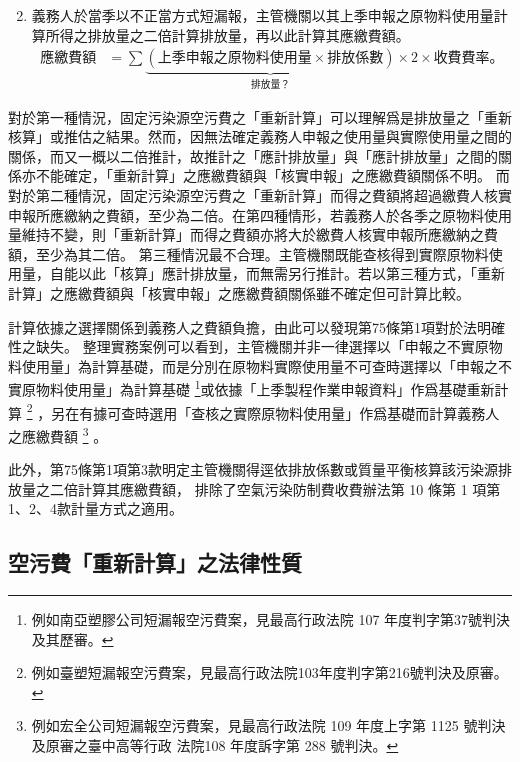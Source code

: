 \begin{enumerate}
\begin{equation*}
         \end{equation*}
         \item 義務人於當季以不正當方式短漏報，主管機關以其上季申報之原物料使用量計算所得之排放量之二倍計算排放量，再以此計算其應繳費額。
         \begin{equation*}
            \begin{aligned}
               \text{應繳費額}
               &=\sum \underbrace{\left(\text{上季申報之原物料使用量}\times\text{排放係數}\right)}_{\textstyle\text{排放量？}}\times 2\times
               \text{收費費率。}
            \end{aligned}
            \end{equation*}
\end{enumerate}

對於第一種情況，固定污染源空污費之「重新計算」可以理解爲是排放量之「重新核算」或推估之結果。然而，因無法確定義務人申報之使用量與實際使用量之間的關係，而又一概以二倍推計，故推計之「應計排放量」與「應計排放量」之間的關係亦不能確定，「重新計算」之應繳費額與「核實申報」之應繳費額關係不明。
而對於第二種情況，固定污染源空污費之「重新計算」而得之費額將超過繳費人核實申報所應繳納之費額，至少為二倍。在第四種情形，若義務人於各季之原物料使用量維持不變，則「重新計算」而得之費額亦將大於繳費人核實申報所應繳納之費額，至少為其二倍。
第三種情況最不合理。主管機關既能查核得到實際原物料使用量，自能以此「核算」應計排放量，而無需另行推計。若以第三種方式，「重新計算」之應繳費額與「核實申報」之應繳費額關係雖不確定但可計算比較。

計算依據之選擇關係到義務人之費額負擔，由此可以發現第75條第1項對於法明確性之缺失。
整理實務案例可以看到，主管機關并非一律選擇以「申報之不實原物料使用量」為計算基礎，而是分別在原物料實際使用量不可查時選擇以「申報之不實原物料使用量」為計算基礎
\footnote{例如南亞塑膠公司短漏報空污費案，見最高行政法院 107 年度判字第37號判決及其歷審。}或依據「上季製程作業申報資料」作爲基礎重新計算
\footnote{例如臺塑短漏報空污費案，見最高行政法院103年度判字第216號判決及原審。}
，另在有據可查時選用「查核之實際原物料使用量」作爲基礎而計算義務人之應繳費額
\footnote{例如宏全公司短漏報空污費案，見最高行政法院 109 年度上字第 1125 號判決及原審之臺中高等行政
法院108 年度訴字第 288 號判決。}
。

此外，第75條第1項第3款明定主管機關得逕依排放係數或質量平衡核算該污染源排放量之二倍計算其應繳費額，
排除了空氣污染防制費收費辦法第 10 條第 1 項第1、2、4款計量方式之適用。

\subsection{空污費「重新計算」之法律性質}


